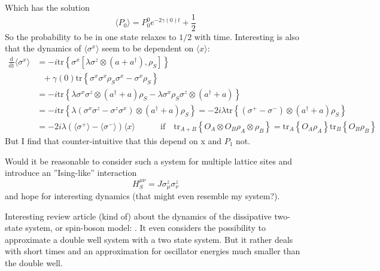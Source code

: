 	Which has the solution
	\begin{equation}
		\langle P_0 \rangle =	P_0^0 e^{-2 \gamma(0) t} + \frac{1}{2}
	\end{equation}
	So the probability to be in one state relaxes to $1/2$ with time.
	Interesting is also that the dynamics of $\langle \sigma^x \rangle$ seem to be dependent on $\langle x \rangle$:
	\begin{align*}
		\frac{\text{d}}{\text{dt}} \langle \sigma^x \rangle &= -i \text{tr} \left\{\sigma^x \left[ \lambda \sigma^z \otimes (a + a^\dagger), \rho_S\right]\right\} \\
		&~~~+ \gamma(0) \text{tr} \left\{\sigma^x \sigma^x \rho_S \sigma^x - \sigma^x \rho_S \right\} \\
		&= - i \text{tr} \left\{\lambda \sigma^x \sigma^z \otimes (a^\dagger + a) \rho_S - \lambda \sigma^x \rho_S \sigma^z \otimes (a^\dagger + a)\right\} \\
		&=- i \text{tr} \left\{\lambda \left(\sigma^x \sigma^z - \sigma^z \sigma^x \right) \otimes (a^\dagger + a) \rho_S \right\}  =	- 2i\lambda \text{tr}\left\{ \left(\sigma^+ - \sigma^- \right) \otimes (a^\dagger +a) \rho_S \right\}\\
		&= -2 i \lambda \left(\langle \sigma^+\rangle -  \langle \sigma^-  \rangle\right) \langle x \rangle \qquad \quad \text{if} \quad \text{tr}_{A + B} \left\{ O_A \otimes O_B \rho_A \otimes \rho_B \right\} =	\text{tr}_A\left\{ O_A \rho_A\right\} \text{tr}_B\left\{ O_B \rho_B\right\}
	\end{align*}
	But I find that counter-intuitive that this depend on x and $P_1$ not.
	
	Would it be reasonable to consider such a system for multiple lattice sites and introduce an ''Ising-like'' interaction
	\begin{equation}
		H_S^{\mu \nu} = J \sigma_\mu^z \sigma_\nu^z
	\end{equation}
	and hope for interesting dynamics (that might even resemble my system?).
	
	Interesting review article (kind of) about the dynamics of the dissipative two-state system, or spin-boson model: \cite{leggett1987dynamics}. It even considers the possibility to approximate a double well system with a two state system. But it rather deals with short times and an approximation for oscillator energies much smaller than the double well.
